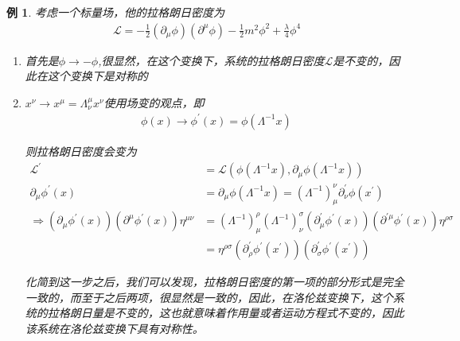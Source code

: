 \documentclass{article}
\newtheorem{example}{例}
\begin{document}
\begin{example}
    考虑一个标量场，他的拉格朗日密度为
    \begin{align*}
        \mathcal{L}=-\frac{1}{2}(\partial_\mu\phi)(\partial^\mu\phi)-\frac{1}{2}m^2\phi^2+\frac{\lambda}{4}\phi^4
    \end{align*}

    \begin{enumerate}
        \item 首先是$\phi\to-\phi$,很显然，在这个变换下，系统的拉格朗日密度$\mathcal{L}$是不变的，因此在这个变换下是对称的
        \item $x^\nu\to x^\mu=\varLambda^\mu_\nu x^\nu$使用场变的观点，即
        \begin{align*}
            \phi(x)\to\phi^\prime(x)=\phi(\varLambda^{-1}x)
        \end{align*}

        则拉格朗日密度会变为
        \begin{align*}
            \mathcal{L}^\prime&=\mathcal{L}(\phi(\varLambda^{-1}x),\partial_\mu\phi(\varLambda^{-1}x))\\
            \partial_\mu\phi^\prime(x)&=\partial_\mu\phi(\varLambda^{-1}x)=\left(\varLambda^{-1}\right)^\nu_\mu \partial^\prime_\nu\phi(x^\prime)\\
            \Rightarrow \left(\partial_\mu\phi^\prime(x)\right)\left(\partial^\mu\phi^\prime(x)\right)\eta^{\mu\nu}&=\left(\varLambda^{-1}\right)^\rho_\mu\left(\varLambda^{-1}\right)^\sigma_\nu\left(\partial^\prime_\mu\phi^\prime(x)\right)\left(\partial^{\prime\mu}\phi^\prime(x)\right)\eta^{\rho\sigma}\\
            &=\eta^{\rho\sigma}\left(\partial^\prime_\rho\phi^\prime(x^\prime)\right)\left(\partial^{\prime}_\sigma\phi^\prime(x^\prime)\right)
        \end{align*}

        化简到这一步之后，我们可以发现，拉格朗日密度的第一项的部分形式是完全一致的，而至于之后两项，很显然是一致的，因此，在洛伦兹变换下，这个系统的拉格朗日量是不变的，这也就意味着作用量或者运动方程式不变的，因此该系统在洛伦兹变换下具有对称性。
    \end{enumerate}
\end{example}
\end{document}
